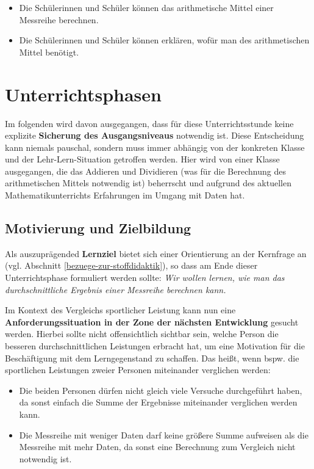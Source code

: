 \documentclass[
]{scrbook}
\providecommand{\tightlist}{%
  \setlength{\itemsep}{0pt}\setlength{\parskip}{0pt}}
\theoremstyle{definition}
\theoremstyle{definition}
\theoremstyle{definition}
\theoremstyle{definition}
\theoremstyle{remark}
\begin{document}
\begin{itemize}
\tightlist
\item
  Die Schülerinnen und Schüler können das arithmetische Mittel einer Messreihe berechnen.\\
\item
  Die Schülerinnen und Schüler können erklären, wofür man des arithmetischen Mittel benötigt.
\end{itemize}

\section{Unterrichtsphasen}\label{unterrichtsphasen}

Im folgenden wird davon ausgegangen, dass für diese Unterrichtsstunde keine explizite \textbf{Sicherung des Ausgangsniveaus} notwendig ist. Diese Entscheidung kann niemals pauschal, sondern muss immer abhängig von der konkreten Klasse und der Lehr-Lern-Situation getroffen werden. Hier wird von einer Klasse ausgegangen, die das Addieren und Dividieren (was für die Berechnung des arithmetischen Mittels notwendig ist) beherrscht und aufgrund des aktuellen Mathematikunterrichts Erfahrungen im Umgang mit Daten hat.

\subsection{Motivierung und Zielbildung}\label{motivierung-und-zielbildung-1}

Als auszuprägended \textbf{Lernziel} bietet sich einer Orientierung an der Kernfrage an (vgl. Abschnitt \ref{bezuege-zur-stoffdidaktik}), so dass am Ende dieser Unterrichtsphase formuliert werden sollte: \emph{Wir wollen lernen, wie man das durchschnittliche Ergebnis einer Messreihe berechnen kann.}

Im Kontext des Vergleichs sportlicher Leistung kann nun eine \textbf{Anforderungssituation in der Zone der nächsten Entwicklung} gesucht werden. Hierbei sollte nicht offensichtlich sichtbar sein, welche Person die besseren durchschnittlichen Leistungen erbracht hat, um eine Motivation für die Beschäftigung mit dem Lerngegenstand zu schaffen. Das heißt, wenn bspw. die sportlichen Leistungen zweier Personen miteinander verglichen werden:

\begin{itemize}
\tightlist
\item
  Die beiden Personen dürfen nicht gleich viele Versuche durchgeführt haben, da sonst einfach die Summe der Ergebnisse miteinander verglichen werden kann.
\item
  Die Messreihe mit weniger Daten darf keine größere Summe aufweisen als die Messreihe mit mehr Daten, da sonst eine Berechnung zum Vergleich nicht notwendig ist.
\end{itemize}
\end{document}
